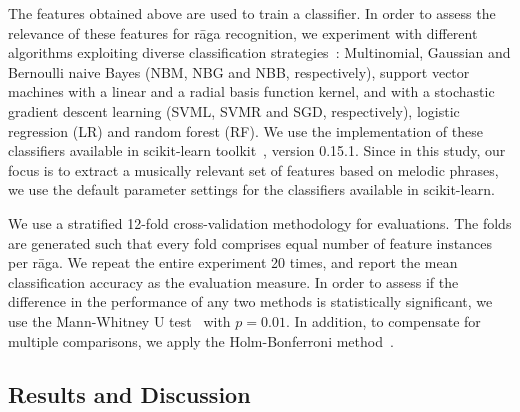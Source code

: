 The features obtained above are used to train a classifier. In order to assess the relevance of these features for r\={a}ga recognition, we experiment with different algorithms exploiting diverse classification strategies~\cite{Hastie09BOOK}: Multinomial, Gaussian and Bernoulli naive Bayes (NBM, NBG and NBB, respectively), support vector machines with a linear and a radial basis function kernel, and with a stochastic gradient descent learning (SVML, SVMR and SGD, respectively), logistic regression (LR) and random forest (RF). We use the implementation of these classifiers available in scikit-learn toolkit~\cite{scikitlearn}, version 0.15.1. Since in this study, our focus is to extract a musically relevant set of features based on melodic phrases, we use the  default parameter settings for the classifiers available in scikit-learn. 

We use a stratified 12-fold cross-validation methodology for evaluations. The folds are generated such that every fold comprises equal number of feature instances per r\={a}ga. We repeat the entire experiment 20 times, and report the mean classification accuracy as the evaluation measure. In order to assess if the difference in the performance of any two methods is statistically significant, we use the Mann-Whitney U test~\cite{mann1947test} with $p=0.01$. In addition, to compensate for multiple comparisons, we apply the Holm-Bonferroni method~\cite{holm1979simple}. 


\subsection{Results and Discussion}
\label{sec:vsm_eval_results}


